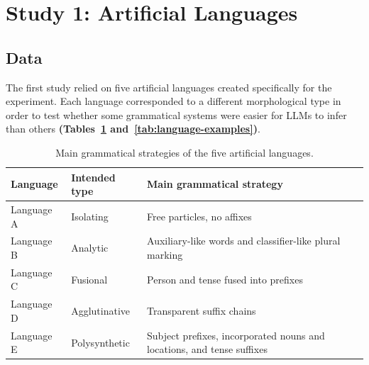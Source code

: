 \documentclass[11pt]{article}
\begin{document}
\section{Study 1: Artificial Languages}\label{study-1-artificial-languages}

\subsection{Data}\label{data}

The first study relied on five artificial languages created specifically for the experiment. Each language corresponded to a different morphological type in order to test whether some grammatical systems were easier for LLMs to infer than others \textbf{(Tables~\ref{tab:language-strategies} and~\ref{tab:language-examples})}.

\begin{table}[t]
    \centering
    \caption{Main grammatical strategies of the five artificial languages.}
    \label{tab:language-strategies}
    \begin{tabularx}{\textwidth}{@{}l l X@{}}
        \toprule
        Language & Intended type & Main grammatical strategy \\
        \midrule
        Language A & Isolating & Free particles, no affixes \\
        Language B & Analytic & Auxiliary-like words and classifier-like plural marking \\
        Language C & Fusional & Person and tense fused into prefixes \\
        Language D & Agglutinative & Transparent suffix chains \\
        Language E & Polysynthetic & Subject prefixes, incorporated nouns and locations, and tense suffixes \\
        \bottomrule
    \end{tabularx}
\end{table}
\end{document}
